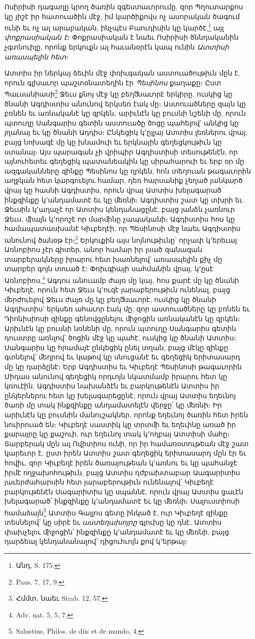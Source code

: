\documentclass{article}
\begin{document}
{Ոսիրիսի դագաղը կրող ծառին զգեստաւորումը, զոր Պղուտարքոս կը յիշէ իր հատուածին մէջ, իմ կարծիքովս ոչ ասորական ծագում ունի եւ ոչ ալ արաբական, ինչպէս Բաուդիսին կը կարծէ,\footnote{Անդ, S. 175.} այլ \emph{փոքրասիական է}։ Փոքրասիական է նաեւ Ոսիրիսի ծննդականին չգտնուիլը, որոնք երկուքն ալ հաւանօրէն կապ ունին \emph{Ատտիսի առասպելին հետ}։

Ատտիս իր ներկայ ձեւին մէջ փռիւգական աստուածութիւն մըն է, որուն գլխաւոր պաշտօնատեղին էր \emph{Պեսինոս} քաղաքը։ Ըստ Պաւսանիասի\footnote{Paus. 7, 17, 9.} Ջեւս քնոյ մէջ կը բեղﬓաւորէ երկիրը, ուսկից կը ծնանի Ագդիստիս անունով երկսեռ էակ մը։ Աստուածները զայն կը բռնեն եւ առնականէ կը զրկեն․ արիւնէն կը բուսնի նշենի մը, որուն պտուղը Սանգարիս գետին աստուածը ծոցը պահելով՝ անկից կը յղանայ եւ կը ծնանի Ադդիս։ Ընկեցիկ կ՚ըլլայ Ատտիս լեռներու վրայ, բայց նոխազէ մը կը խնամուի եւ երկնային գեղեցկութիւն կը ստանայ։ Այս պարագան չի վրիպիր Ագդիստիսի տեսութենէն, որ այնուհետեւ գեղեցիկ պատանեակին կը սիրահարուի եւ երբ օր մը ազգականները զինքը Պեսինոս կը ղրկեն, հոն տեղուան թագաւորին աղջկան հետ կարգուելու համար, դեռ հարսանիք չեղած յանկարծ վրայ կը հասնի Ագդիստիս, որուն վրայ Ատտիս խելագարած ինքզինքը կ՚անդամատէ եւ կը ﬔռնի։ Ագդիստիս շատ կը տխրի եւ Ջեւսին կ՚աղաչէ որ Ատտիս կենդանացընէ, բայց յանձն չառնուր Ջեւս, ﬕայն կ՚որոշէ որ մարﬕնը չապականի։ Ագդիստիս հոս կը համապատասխանէ Կիւբեղէի, որ Պեսինոսի մէջ նաեւ Ագդիստիս անունով ծանօթ էր։\footnote{Հմմտ․ նաեւ Strab. 12, 57.} Երկուքին այս նոյնութիւնը՝ որչափ կ՚երեւայ Առնոբիոս չէր գիտեր, անոր համար իր լսած զանազան տարբերակները իրարու հետ խառնելով՝ առասպելին քիչ մը տարբեր գոյն տուած է։ Փռիւգիայի սահմանին վրայ, կ՚ըսէ Առնոբիոս,\footnote{Adv. nat. 5, 5, 7.} Ագդոս անուամբ ժայռ մը կայ․ հոս քարէ մը կը ծնանի Կիւբեղէ, որուն հետ Ջեւս կ՚ուզէ յարաբերութիւն ունենալ, բայց ﬔրժուելով Ջեւս ժայռ մը կը բեղﬓաւորէ, ուսկից կը ծնանի Ագդիստիս՝ երկսեռ ահաւոր էակ մը, զոր աստուածները կը բռնեն եւ Դիոնիսիոսի զինքը գենովցընելու ﬕջոցին առնականէն կը զրկեն։ Արիւնէն կը բուսնի նռնենի մը, որուն պտուղը Սանգարիս գետին դուստրը առնլով՝ ծոցին մէջ կը պահէ, ուսկից կը ծնանի Ատտիս։ Սանգարիս կը հրամայէ ընկեցիկ ընել տղան, բայց մէկը զինքը գտնելով՝ ﬔղրով եւ կաթով կը սնուցանէ եւ գեղեցիկ երիտասարդ մը կը դարձընէ։ Երբ Ագդիստիս եւ Կիւբեղէ Պեսինոսի թագաւորին Միդաս անունով գեղեցիկ որդւոյն նկատմամբ իրարու հետ կը կռուէին, Ագդիստիս նախանձէն եւ բարկութենէն Ատտիս իր ընկերներու հետ կը խելագարեցընէ, որուն վրայ Ատտիս եղեւնոյ ծառի մը տակ ինքզինքը անդամատելէն վերջը՝ կը ﬔռնի։ Իր արիւնէն կը բուսնին մանուշակներ, որոնք եղեւնոյ ծառին հետ իրեն նուիրուած են։ Կիւբեղէ սաստիկ կը տրտﬕ եւ եղեւինը առած իր քարայրը կը քաշուի, ուր եղեւնոյ տակ կ՚ողբայ Ատտիսի մահը։ Տարբերակ մըն ալ Ովիտիոս ունի, որ իր համառօտութեան մէջ շատ կարեւոր է․ ըստ իրեն Ատտիս շատ գեղեցիկ երիտասարդ մըն էր եւ հովիւ, զոր Կիւբեղէ իրեն ծառայութեան կ՚առնու եւ կը պահանջէ իրմէ ողջախոհութիւն, բայց Ատտիս դժբախտաբար Աագարիտիս յաւերժահարսին հետ յարաբերութիւն ունենալով՝ Կիւբեղէ բարկութենէն Սագարիտիս կը սպաննէ, որուն վրայ Ատտիս ցաւէն խելագարած՝ ինքզինքը կ՚անդամատէ եւ կը ﬔռնի։ Սալուստիոսի համաձայն\footnote{Salustius, Philos. de diis et de mundo, 4.} Ատտիս Գալլոս գետը ինկած է, ուր Կիւբեղէ զինքը տեսնելով՝ կը սիրէ եւ \emph{աստեղախոյրը} գլուխը կը դնէ․ Ատտիս փախչելու ﬕջոցին՝ ինքզինքը կ՚անդամատէ եւ կը ﬔռնի, բայց դարձեալ կենդանանալով՝ դիցուհւոյն քով կ՚երթայ։

}
\end{document}
